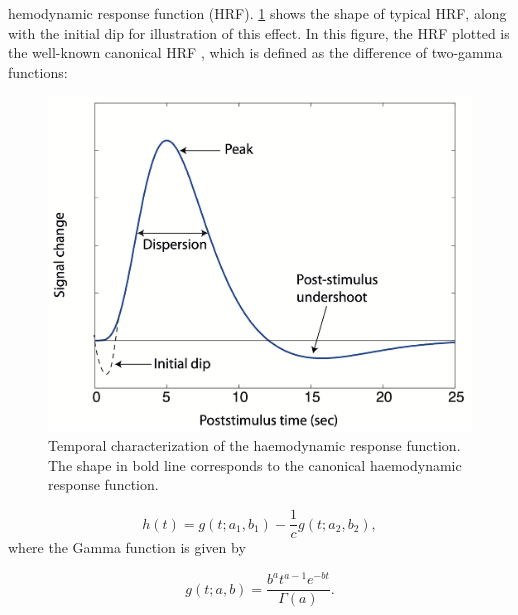 hemodynamic response function (HRF). \cref{fig:hrf_shape} shows the shape of
typical HRF, along with the initial dip for illustration of this effect. In this
figure, the HRF plotted is the well-known canonical HRF
\citep{Friston2007Statisticalparametricmapping,Friston1998EventRelatedfMRI},
which is defined as the difference of two-gamma functions:
\begin{figure}[t!]
    \centerline{\includegraphics[width=\textwidth]{figures/introduction/hrf_shape.png}}
    \caption{Temporal characterization of the haemodynamic response function.
    The shape in bold line corresponds to the canonical haemodynamic response
    function.}
\label{fig:hrf_shape}
\end{figure}

\begin{equation}
    h(t)=g(t; a_1, b_1) - \frac{1}{c}g(t; a_2, b_2),
\end{equation}
where the Gamma function is given by

\begin{equation}
    g(t; a, b) = \frac{b^a t^{a-1} e^{-bt}}{\Gamma(a)}.
\end{equation}

